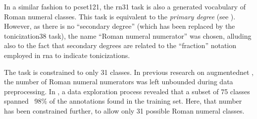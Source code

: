 
In a similar fashion to \gls{pcset121}, the \gls{rn31} task
is also a generated vocabulary of Roman numeral classes.
This task is equivalent to the \emph{primary degree} (see
). However, as there is no
``secondary degree'' (which has been replaced by the
\gls{tonicization38} task), the name ``Roman numeral
numerator'' was chosen, alluding also to the fact that
secondary degrees are related to the ``fraction'' notation
employed in \gls{rna} to indicate tonicizations.

The task is constrained to only 31 classes. In previous
research on \gls{augmentednet}
\parencite{napoleslopez2021augmentednet}, the number of
Roman numeral numerators was left unbounded during data
preprocessing. In \textcite{napoleslopez2021augmentednet}, a
data exploration process revealed that a subset of 75
classes spanned ~98\% of the annotations found in the
training set. Here, that number has been constrained
further, to allow only 31 possible Roman numeral classes.
